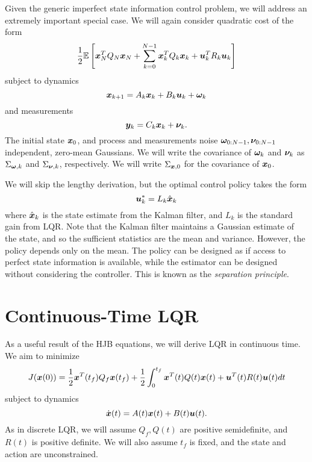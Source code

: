 Given the generic imperfect state information control problem, we will address an extremely important special case. We will again consider quadratic cost of the form
\begin{equation}
    \frac{1}{2} \mathbb{E}\left[ \bm{x}_N^T Q_N \bm{x}_N + \sum_{k=0}^{N-1} \bm{x}_k^T Q_k \bm{x}_k + \bm{u}_k^T R_k \bm{u}_k \right]
\end{equation}
subject to dynamics
\begin{equation}
    \bm{x}_{k+1} = A_k \bm{x}_k + B_k \bm{u}_k + \bm{\omega}_{k}
\end{equation}
and measurements
\begin{equation}
    \bm{y}_k = C_k \bm{x}_k + \bm{\nu}_k.
\end{equation}
The initial state $\bm{x}_0$, and process and measurements noise $\bm{\omega}_{0:N-1},\bm{\nu}_{0:N-1}$ independent, zero-mean Gaussians. We will write the covariance of $\bm{\omega}_k$ and $\bm{\nu}_k$ as $\Sigma_{\bm{\omega},k}$ and $\Sigma_{\bm{\nu},k}$, respectively. We will write $\Sigma_{\bm{x},0}$ for the covariance of $\bm{x}_0$.

We will skip the lengthy derivation, but the optimal control policy takes the form
\begin{equation}
    \bm{u}_k^* = L_k \hat{\bm{x}}_k
\end{equation}
where $\hat{\bm{x}}_k$ is the state estimate from the Kalman filter, and $L_k$ is the standard gain from LQR. Note that the Kalman filter maintains a Gaussian estimate of the state, and so the sufficient statistics are the mean and variance. However, the policy depends only on the mean. The policy can be designed as if access to perfect state information is available, while the estimator can be designed without considering the controller. This is known as the \textit{separation principle}.



\section{Continuous-Time LQR}

As a useful result of the HJB equations, we will derive LQR in continuous time. We aim to minimize 
\begin{equation}
    J(\bm{x}(0)) = \frac{1}{2} \bm{x}^T(t_f) Q_f \bm{x}(t_f) + \frac{1}{2} \int_0^{t_f} \bm{x}^T(t) Q(t) \bm{x}(t) + \bm{u}^T(t) R(t) \bm{u}(t) dt
\end{equation}
subject to dynamics
\begin{equation}
    \dot{\bm{x}}(t) = A(t) \bm{x}(t) + B(t) \bm{u}(t).
\end{equation}
As in discrete LQR, we will assume $Q_f, Q(t)$ are positive semidefinite, and $R(t)$ is positive definite. We will also assume $t_f$ is fixed, and the state and action are unconstrained. 

